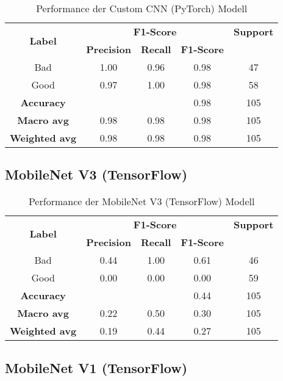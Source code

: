 \begin{table}[H]
\centering
\begin{tabular}{|c|c|c|c|c|}
\hline
\multirow{2}{*}{\textbf{Label}} & \multicolumn{3}{c|}{\textbf{F1-Score}} & \textbf{Support} \\
\cline{2-4}
                               & \textbf{Precision} & \textbf{Recall} & \textbf{F1-Score} & \\
\hline
Bad                           & 1.00 & 0.96 & 0.98 & 47 \\
Good                          & 0.97 & 1.00 & 0.98 & 58 \\
\hline
\textbf{Accuracy}             & & & 0.98 & 105 \\
\hline
\textbf{Macro avg}            & 0.98 & 0.98 & 0.98 & 105 \\
\hline
\textbf{Weighted avg}         & 0.98 & 0.98 & 0.98 & 105 \\
\hline
\end{tabular}
\caption{Performance der Custom CNN (PyTorch) Modell}
\end{table}

\subsection{MobileNet V3 (TensorFlow)}

\begin{table}[H]
\centering
\begin{tabular}{|c|c|c|c|c|}
\hline
\multirow{2}{*}{\textbf{Label}} & \multicolumn{3}{c|}{\textbf{F1-Score}} & \textbf{Support} \\
\cline{2-4}
                               & \textbf{Precision} & \textbf{Recall} & \textbf{F1-Score} & \\
\hline
Bad                           & 0.44 & 1.00 & 0.61 & 46 \\
Good                          & 0.00 & 0.00 & 0.00 & 59 \\
\hline
\textbf{Accuracy}             & & & 0.44 & 105 \\
\hline
\textbf{Macro avg}            & 0.22 & 0.50 & 0.30 & 105 \\
\hline
\textbf{Weighted avg}         & 0.19 & 0.44 & 0.27 & 105 \\
\hline
\end{tabular}
\caption{Performance der MobileNet V3 (TensorFlow) Modell}
\end{table}

\subsection{MobileNet V1 (TensorFlow)}


